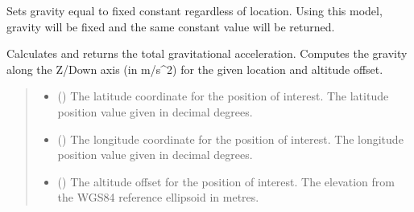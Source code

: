 \documentclass[letterpaper,10pt,english]{sphinxmanual}
\begin{document}
\begin{fulllineitems}
\label{\detokenize{modules/gravity/simple:qnav.gravity.simple.FixedValue}}
\pysigstartsignatures
{}
\pysigstopsignatures
\sphinxAtStartPar
Sets gravity equal to fixed constant regardless of location.
Using this model, gravity will be fixed and the same constant
value will be returned.

\begin{fulllineitems}
\label{\detokenize{modules/gravity/simple:qnav.gravity.simple.FixedValue.calc_gravity_z}}
\pysigstartsignatures
{}
\pysigstopsignatures
\sphinxAtStartPar
Calculates and returns the total gravitational acceleration.
Computes the gravity along the Z/Down axis (in m/s\textasciicircum{}2) for
the given location and altitude offset.
\begin{quote}\begin{description}
\begin{itemize}
\item {} 
\sphinxAtStartPar
{} () \textendash{} The latitude coordinate for the position of interest.
The latitude position value given in decimal degrees.

\item {} 
\sphinxAtStartPar
{} () \textendash{} The longitude coordinate for the position of interest.
The longitude position value given in decimal degrees.

\item {} 
\sphinxAtStartPar
{} () \textendash{} The altitude offset for the position of interest.
The elevation from the WGS\sphinxhyphen{}84 reference ellipsoid in metres.


\end{itemize}
\end{description}
\end{quote}
\end{fulllineitems}
\end{fulllineitems}
\end{document}
